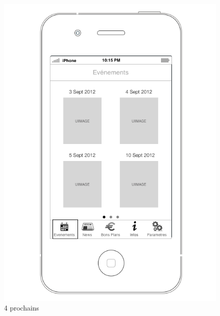 \documentclass[a4paper, 11px]{article}
\begin{document}
\begin{figure}[htbp]
\begin{minipage}[c]{.33\linewidth}
	\end{minipage}
	\begin{minipage}[c]{.32\linewidth}
		\begin{center}
			\includegraphics[scale=0.3]{../../Sketch/iOS/evenements_4_prochains.png}
		\end{center}
	\caption{4 prochains}
	\label{4_prochains}

	\end{minipage}
\end{figure}
\vfill
\clearpage
\end{document}
